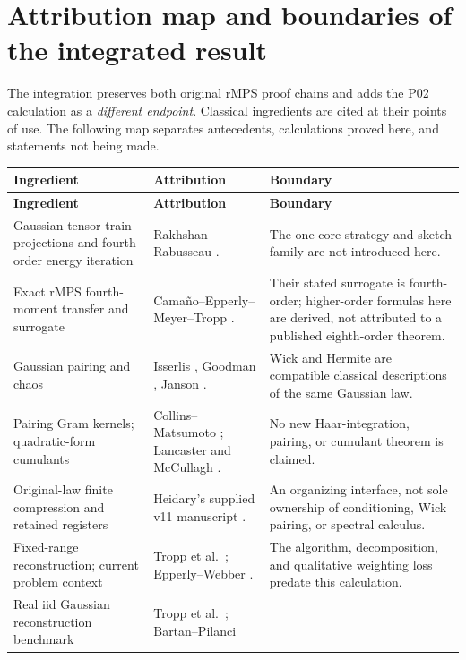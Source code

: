 \documentclass[11pt]{article}
\numberwithin{equation}{section}
\theoremstyle{definition}\newtheorem{definition}[theorem]{Definition}
\theoremstyle{remark}\newtheorem{remark}[theorem]{Remark}
\begin{document}
\clearpage
\section{Attribution map and boundaries of the integrated result}
\label{p02:app:audit}
The integration preserves both original rMPS proof chains and adds the P02
calculation as a \emph{different endpoint}. Classical ingredients are cited
at their points of use. The following map separates antecedents, calculations
proved here, and statements not being made.

\begingroup\small\renewcommand{\arraystretch}{1.2}
\begin{longtable}{@{}P{.24\textwidth}P{.39\textwidth}P{.31\textwidth}@{}}
\toprule
\textbf{Ingredient}&\textbf{Attribution}&\textbf{Boundary}\\
\midrule\endfirsthead
\toprule\textbf{Ingredient}&\textbf{Attribution}&\textbf{Boundary}\\\midrule\endhead
Gaussian tensor-train projections and fourth-order energy iteration &
Rakhshan--Rabusseau \cite[Theorem~1, Section~5.1]{RR2020}. &
The one-core strategy and sketch family are not introduced here.\\
Exact rMPS fourth-moment transfer and surrogate &
Cama\~no--Epperly--Meyer--Tropp \cite[Section~4]{CEMT}. &
Their stated surrogate is fourth-order; higher-order formulas here are derived,
not attributed to a published eighth-order theorem.\\
Gaussian pairing and chaos &
Isserlis \cite{Isserlis}, Goodman \cite{Goodman}, Janson \cite{Janson}. &
Wick and Hermite are compatible classical descriptions of the same Gaussian law.\\
Pairing Gram kernels; quadratic-form cumulants &
Collins--Matsumoto \cite{CollinsMatsumoto}; Lancaster and McCullagh
\cite{Lancaster,McCullagh}. &
No new Haar-integration, pairing, or cumulant theorem is claimed.\\
Original-law finite compression and retained registers &
Heidary's supplied v11 manuscript \cite{Framework}. &
An organizing interface, not sole ownership of conditioning, Wick pairing,
or spectral calculus.\\
Fixed-range reconstruction; current problem context &
Tropp et al.\ \cite[Section~4, Lemmas~A.3--A.5]{TYUC2017};
Epperly--Webber \cite[Sections~5 and~7]{EW}. &
The algorithm, decomposition, and qualitative weighting loss predate this calculation.\\
Real iid Gaussian reconstruction benchmark &
Tropp et al.\ \cite[Lemma~A.5]{TYUC2017}; Bartan--Pilanci

\end{longtable}
\end{document}
